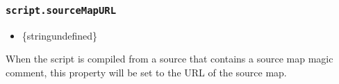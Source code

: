 \begin{Shaded}
\begin{Highlighting}[]
\OperatorTok{=} \NormalTok{(}\NormalTok{)}\OperatorTok{;}

 \OperatorTok{=} \OperatorTok{;}

\OperatorTok{=} \NormalTok{(}\OperatorTok{,}\NormalTok{ \{ }\OperatorTok{:} \NormalTok{ \})}\OperatorTok{;}

\NormalTok{ (}\OperatorTok{=} \OperatorTok{;}\OperatorTok{\textless{}} \OperatorTok{;} \OperatorTok{++}
\NormalTok{()}\OperatorTok{;}
\NormalTok{\}}

\OperatorTok{;}

\end{Highlighting}
\end{Shaded}

\subsubsection{\texorpdfstring{\texttt{script.sourceMapURL}}{script.sourceMapURL}}\label{script.sourcemapurl}

\begin{itemize}
\tightlist
\item
  \{string\textbar undefined\}
\end{itemize}

When the script is compiled from a source that contains a source map
magic comment, this property will be set to the URL of the source map.

\begin{Shaded}
\begin{Highlighting}[]
 \OperatorTok{;}

\OperatorTok{=} \NormalTok{(}\VerbatimStringTok{\textasciigrave{}}
\VerbatimStringTok{\textasciigrave{}}\NormalTok{)}\OperatorTok{;}

\NormalTok{)}\OperatorTok{;}
\end{Highlighting}
\end{Shaded}

